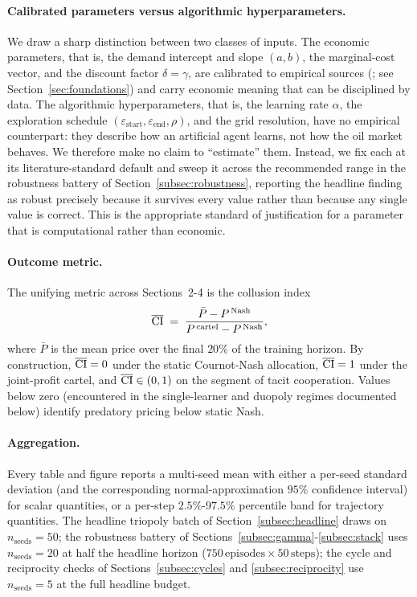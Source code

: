 \paragraph{Calibrated parameters versus algorithmic
hyperparameters.}
We draw a sharp distinction between two classes of inputs. The
economic parameters, that is, the demand intercept and
slope $(a,b)$, the marginal-cost vector, and the discount factor
$\delta=\gamma$, are calibrated to empirical sources
(\citealp{dallasfed2026,bp2022,imf2021}; see Section~\ref{sec:foundations}) and carry economic meaning that can be
disciplined by data. The algorithmic hyperparameters, that
is, the learning rate $\alpha$, the exploration schedule
$(\varepsilon_{\text{start}},\varepsilon_{\text{end}},\rho)$, and
the grid resolution, have no empirical counterpart: they describe
how an artificial agent learns, not how the oil market behaves.
We therefore make no claim to ``estimate'' them. Instead, we fix
each at its literature-standard default and sweep it across
the recommended range in the robustness battery of
Section~\ref{subsec:robustness}, reporting the headline finding as
robust precisely because it survives every value rather than
because any single value is correct. This is the appropriate
standard of justification for a parameter that is computational
rather than economic.

\paragraph{Outcome metric.}
The unifying metric across Sections~2-4 is the collusion index
\begin{equation}
  \label{eq:ci}
  \overline{\mathrm{CI}} \;=\;
    \frac{\bar{P} - P^{\,\text{Nash}}}
         {P^{\,\text{cartel}} - P^{\,\text{Nash}}},
\end{equation}
where $\bar{P}$ is the mean price over the final $20\%$ of the
training horizon. By construction, $\overline{\mathrm{CI}} = 0$ under the static
Cournot-Nash allocation, $\overline{\mathrm{CI}} = 1$ under the joint-profit cartel,
and $\overline{\mathrm{CI}} \in (0,1)$ on the segment of tacit cooperation. Values
below zero (encountered in the single-learner and duopoly regimes
documented below) identify predatory pricing below static Nash.

\paragraph{Aggregation.}
Every table and figure reports a multi-seed mean with either a
per-seed standard deviation (and the corresponding
normal-approximation $95\%$ confidence interval) for scalar
quantities, or a per-step $2.5\%$-$97.5\%$ percentile band for
trajectory quantities. The headline triopoly batch of
Section~\ref{subsec:headline} draws on $n_{\text{seeds}} = 50$;
the robustness battery of
Sections~\ref{subsec:gamma}-\ref{subsec:stack} uses
$n_{\text{seeds}} = 20$ at half the headline horizon
($750\,\text{episodes} \times 50\,\text{steps}$); the cycle and
reciprocity checks of Sections~\ref{subsec:cycles} and
\ref{subsec:reciprocity} use $n_{\text{seeds}} = 5$ at the full
headline budget.

